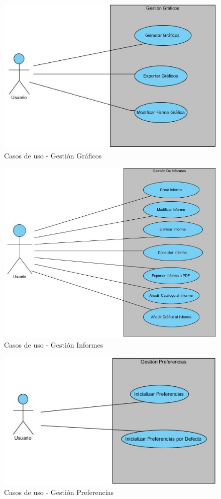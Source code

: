 \documentclass[a4paper,11pt]{book}
\begin{document}
\begin{figure}[H] 
\centering 
\includegraphics[scale=0.50]{imagenes/casosUso/graficos.jpg}
\caption{ Casos de uso - Gestión Gráficos  }  
\end{figure}


\begin{figure}[H] 
\centering 
\includegraphics[scale=0.50]{imagenes/casosUso/Informe.jpg}
\caption{ Casos de uso - Gestión Informes  }  
\end{figure}

\begin{figure}[H] 
\centering 
\includegraphics[scale=0.50]{imagenes/casosUso/Preferencias.jpg}
\caption{ Casos de uso - Gestión Preferencias  }  
\end{figure}
\end{document}
